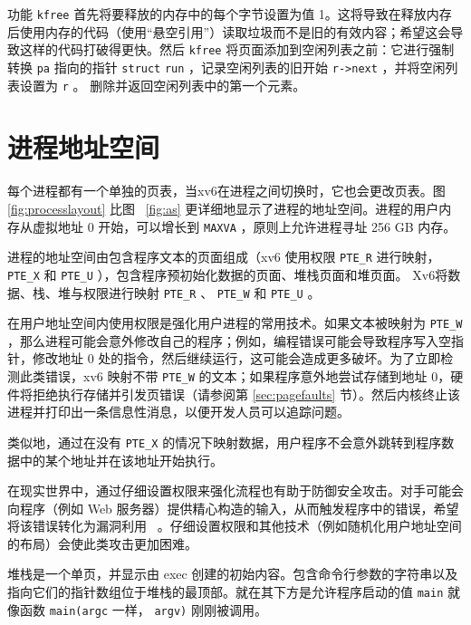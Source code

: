 功能
    \lstinline{kfree}   
        首先将要释放的内存中的每个字节设置为值 1。这将导致在释放内存后使用内存的代码（使用“悬空引用”）读取垃圾而不是旧的有效内容；希望这会导致这样的代码打破得更快。然后
    \lstinline{kfree}    将页面添加到空闲列表之前：它进行强制转换
    \lstinline{pa}    指向的指针
    \lstinline{struct}   
    \lstinline{run}    ，记录空闲列表的旧开始
    \lstinline{r->next}    ，并将空闲列表设置为
    \lstinline{r}   。
        删除并返回空闲列表中的第一个元素。  

   \section{进程地址空间  }     

每个进程都有一个单独的页表，当xv6在进程之间切换时，它也会更改页表。图~    \ref{fig:processlayout}    比图~    \ref{fig:as}    更详细地显示了进程的地址空间。进程的用户内存从虚拟地址 0 开始，可以增长到    \texttt{MAXVA}   
        ，原则上允许进程寻址 256 GB 内存。  

进程的地址空间由包含程序文本的页面组成（xv6 使用权限    \lstinline{PTE_R}    进行映射，
    \lstinline{PTE_X}    和    \lstinline{PTE_U}    ），包含程序预初始化数据的页面、堆栈页面和堆页面。 Xv6将数据、栈、堆与权限进行映射
    \lstinline{PTE_R}    、    \lstinline{PTE_W}    和    \lstinline{PTE_U}    。  

在用户地址空间内使用权限是强化用户进程的常用技术。如果文本被映射为
    \lstinline{PTE_W}    ，那么进程可能会意外修改自己的程序；例如，编程错误可能会导致程序写入空指针，修改地址 0 处的指令，然后继续运行，这可能会造成更多破坏。为了立即检测此类错误，xv6 映射不带    \lstinline{PTE_W}    的文本；如果程序意外地尝试存储到地址 0，硬件将拒绝执行存储并引发页错误（请参阅第    \ref{sec:pagefaults}    节）。然后内核终止该进程并打印出一条信息性消息，以便开发人员可以追踪问题。  

类似地，通过在没有    \lstinline{PTE_X}    的情况下映射数据，用户程序不会意外跳转到程序数据中的某个地址并在该地址开始执行。  

在现实世界中，通过仔细设置权限来强化流程也有助于防御安全攻击。对手可能会向程序（例如 Web 服务器）提供精心构造的输入，从而触发程序中的错误，希望将该错误转化为漏洞利用~    \cite{aleph:smashing}    。仔细设置权限和其他技术（例如随机化用户地址空间的布局）会使此类攻击更加困难。  

堆栈是一个单页，并显示由 exec 创建的初始内容。包含命令行参数的字符串以及指向它们的指针数组位于堆栈的最顶部。就在其下方是允许程序启动的值
    \lstinline{main}    就像函数    \lstinline{main(argc}    一样，
    \lstinline{argv)}    刚刚被调用。  

